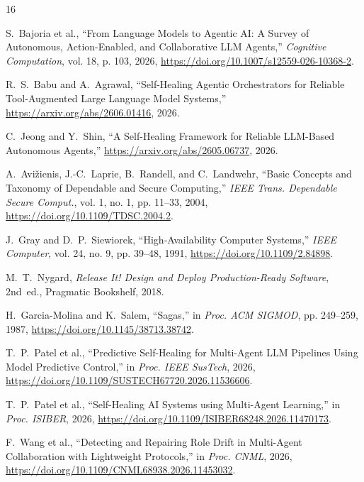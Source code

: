 \documentclass[conference]{IEEEtran}
\newcommand{\chg}[1]{{\color{blue}#1}}
\begin{document}
\begin{thebibliography}{16}
\footnotesize
\def\UrlFont{\tiny\rmfamily}
\setlength{\itemsep}{0pt plus 0.2pt}
\setlength{\parsep}{0pt}
\setlength{\parskip}{0pt}

S.~Bajoria et al., ``From Language Models to Agentic AI: A Survey of Autonomous, Action-Enabled, and Collaborative LLM Agents,'' \emph{Cognitive Computation}, vol. 18, p. 103, 2026, \url{https://doi.org/10.1007/s12559-026-10368-2}.

R.~S.~Babu and A.~Agrawal, ``Self-Healing Agentic Orchestrators for Reliable Tool-Augmented Large Language Model Systems,'' \url{https://arxiv.org/abs/2606.01416}, 2026.

C.~Jeong and Y.~Shin, ``A Self-Healing Framework for Reliable LLM-Based Autonomous Agents,'' \url{https://arxiv.org/abs/2605.06737}, 2026.

\chg{
A.~Avi\v{z}ienis, J.-C.~Laprie, B.~Randell, and C.~Landwehr, ``Basic Concepts and Taxonomy of Dependable and Secure Computing,'' \emph{IEEE Trans. Dependable Secure Comput.}, vol. 1, no. 1, pp. 11--33, 2004, \url{https://doi.org/10.1109/TDSC.2004.2}.}

\chg{
J.~Gray and D.~P.~Siewiorek, ``High-Availability Computer Systems,'' \emph{IEEE Computer}, vol. 24, no. 9, pp. 39--48, 1991, \url{https://doi.org/10.1109/2.84898}.}

\chg{
M.~T.~Nygard, \emph{Release It! Design and Deploy Production-Ready Software}, 2nd~ed., Pragmatic Bookshelf, 2018.}

\chg{
H.~Garcia-Molina and K.~Salem, ``Sagas,'' in \emph{Proc. ACM SIGMOD}, pp. 249--259, 1987, \url{https://doi.org/10.1145/38713.38742}.}

T.~P.~Patel et al., ``Predictive Self-Healing for Multi-Agent LLM Pipelines Using Model Predictive Control,'' in \emph{Proc. IEEE SusTech}, 2026, \url{https://doi.org/10.1109/SUSTECH67720.2026.11536606}.

T.~P.~Patel et al., ``Self-Healing AI Systems using Multi-Agent Learning,'' in \emph{Proc. ISIBER}, 2026, \url{https://doi.org/10.1109/ISIBER68248.2026.11470173}.

F.~Wang et al., ``Detecting and Repairing Role Drift in Multi-Agent Collaboration with Lightweight Protocols,'' in \emph{Proc. CNML}, 2026, \url{https://doi.org/10.1109/CNML68938.2026.11453032}.


\end{thebibliography}
\end{document}
